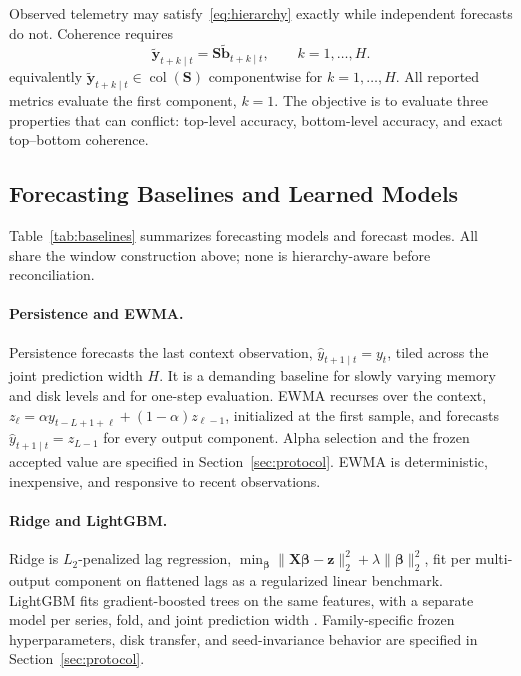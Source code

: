 \documentclass[a4paper,fleqn]{cas-dc}
\begin{document}
Observed telemetry may satisfy~\eqref{eq:hierarchy} exactly while independent
forecasts do not.
Coherence requires
\[
\widetilde{\mathbf{y}}_{t+k\mid t}
=
\mathbf{S}\widetilde{\mathbf{b}}_{t+k\mid t},
\qquad k=1,\ldots,H.
\]
equivalently $\widetilde{\mathbf{y}}_{t+k\mid t}\in\operatorname{col}(\mathbf{S})$
componentwise for $k=1,\ldots,H$.
All reported metrics evaluate the first component, $k=1$.
The objective is to evaluate three properties that can conflict: top-level
accuracy, bottom-level accuracy, and exact top--bottom coherence.

\subsection{Forecasting Baselines and Learned Models}
\label{sec:baselines}
Table~\ref{tab:baselines} summarizes forecasting models and forecast modes.
All share the window construction above; none is hierarchy-aware before
reconciliation.


\FloatBarrier

\paragraph{Persistence and {EWMA}.}
Persistence forecasts the last context observation,
$\hat{y}_{t+1\mid t}=y_t$, tiled across the joint prediction width $H$.
It is a demanding baseline for slowly varying memory and disk levels and for
one-step evaluation.
{EWMA} recurses over the context,
$z_{\ell}=\alpha y_{t-L+1+\ell}+(1-\alpha)z_{\ell-1}$, initialized at the first
sample, and forecasts $\hat{y}_{t+1\mid t}=z_{L-1}$ for every output component.
Alpha selection and the frozen accepted value are specified in
Section~\ref{sec:protocol}.
{EWMA} is deterministic, inexpensive, and responsive to recent observations.

\paragraph{Ridge and LightGBM.}
Ridge is $L_2$-penalized lag regression,
$\min_{\boldsymbol{\beta}}\|\mathbf{X}\boldsymbol{\beta}-\mathbf{z}\|_2^2
+\lambda\|\boldsymbol{\beta}\|_2^2$,
fit per multi-output component on flattened lags as a regularized linear
benchmark.
LightGBM fits gradient-boosted trees on the same features, with a separate model
per series, fold, and joint prediction width \cite{ke2017lightgbm}.
Family-specific frozen hyperparameters, disk transfer, and seed-invariance
behavior are specified in Section~\ref{sec:protocol}.
\end{document}
